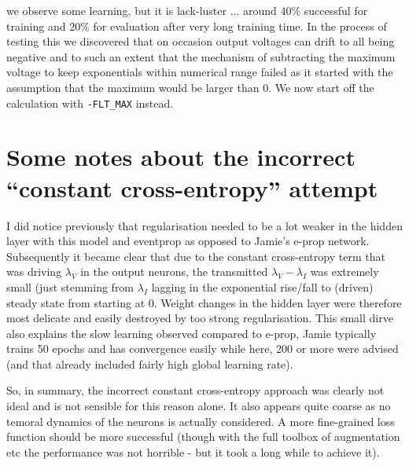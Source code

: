 \documentclass[a4paper]{article}
\begin{document}
     we observe some learning, but it is lack-luster ... around 40\% successful for training and 20\% for evaluation after very long training time. In the process of testing this we discovered that on occasion output voltages can drift to all being negative and to such an extent that the mechanism of subtracting the maximum voltage to keep exponentials within numerical range failed as it started with the assumption that the maximum would be larger than 0. We now start off the calculation with \verb+-FLT_MAX+ instead.
     
     \section{Some notes about the incorrect ``constant cross-entropy'' attempt}
     I did notice previously that regularisation needed to be a lot weaker in the hidden layer with this model and eventprop as opposed to Jamie's e-prop network. Subsequently it became clear that due to the constant cross-entropy term that was driving $\lambda_V$ in the output neurons, the transmitted $\lambda_V-\lambda_I$ was extremely small (just stemming from $\lambda_I$ lagging in the exponential rise/fall to (driven) steady state from starting at $0$. Weight changes in the hidden layer were therefore most delicate and easily destroyed by too strong regularisation. This small dirve also explains the slow learning observed compared to e-prop, Jamie typically trains 50 epochs and has convergence easily while here, 200 or more were advised (and that already included fairly high global learning rate).

     So, in summary, the incorrect constant cross-entropy approach was clearly not ideal and is not sensible for this reason alone. It also appears quite coarse as no temoral dynamics of the neurons is actually considered. A more fine-grained loss function should be more successful (though with the full toolbox of augmentation etc the performance was not horrible - but it took a long while to achieve it).


     
\end{document}
